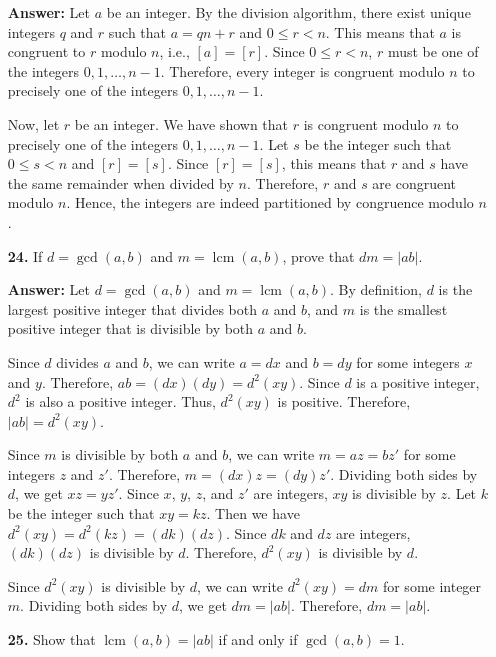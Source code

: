 \documentclass[12pt,reqno]{amsart}
\newcommand{\lcm}{\operatorname{lcm}}
\begin{document}
\begin{enumerate}
\textbf{Answer:} Let $a$ be an integer. By the division algorithm, there exist unique integers $q$ and $r$ such that $a = qn + r$ and $0 \leq r < n$. This means that $a$ is congruent to $r$ modulo $n$, i.e., $[a] = [r]$. Since $0 \leq r < n$, $r$ must be one of the integers $0, 1, \ldots, n-1$. Therefore, every integer is congruent modulo $n$ to precisely one of the integers $0, 1, \ldots, n-1$.

Now, let $r$ be an integer. We have shown that $r$ is congruent modulo $n$ to precisely one of the integers $0, 1, \ldots, n-1$. Let $s$ be the integer such that $0 \leq s < n$ and $[r] = [s]$. Since $[r] = [s]$, this means that $r$ and $s$ have the same remainder when divided by $n$. Therefore, $r$ and $s$ are congruent modulo $n$. Hence, the integers are indeed partitioned by congruence modulo $n$.

\bigskip

\item[{\bf 24.}]
If $d= \gcd(a, b)$ and $m = \lcm(a, b)$, prove that $dm = |ab|$.

\textbf{Answer:} Let $d = \gcd(a, b)$ and $m = \lcm(a, b)$. By definition, $d$ is the largest positive integer that divides both $a$ and $b$, and $m$ is the smallest positive integer that is divisible by both $a$ and $b$.

Since $d$ divides $a$ and $b$, we can write $a = dx$ and $b = dy$ for some integers $x$ and $y$. Therefore, $ab = (dx)(dy) = d^2(xy)$. Since $d$ is a positive integer, $d^2$ is also a positive integer. Thus, $d^2(xy)$ is positive. Therefore, $|ab| = d^2(xy)$.

Since $m$ is divisible by both $a$ and $b$, we can write $m = az = bz'$ for some integers $z$ and $z'$. Therefore, $m = (dx)z = (dy)z'$. Dividing both sides by $d$, we get $x z = y z'$. Since $x$, $y$, $z$, and $z'$ are integers, $xy$ is divisible by $z$. Let $k$ be the integer such that $xy = kz$. Then we have $d^2(xy) = d^2(kz) = (dk)(dz)$. Since $dk$ and $dz$ are integers, $(dk)(dz)$ is divisible by $d$. Therefore, $d^2(xy)$ is divisible by $d$. 

Since $d^2(xy)$ is divisible by $d$, we can write $d^2(xy) = dm$ for some integer $m$. Dividing both sides by $d$, we get $dm = |ab|$. Therefore, $dm = |ab|$.

\bigskip

\item[{\bf 25.}]
Show that $\lcm(a,b) = |ab|$ if and only if $\gcd(a,b) = 1$.


\end{enumerate}
\end{document}
